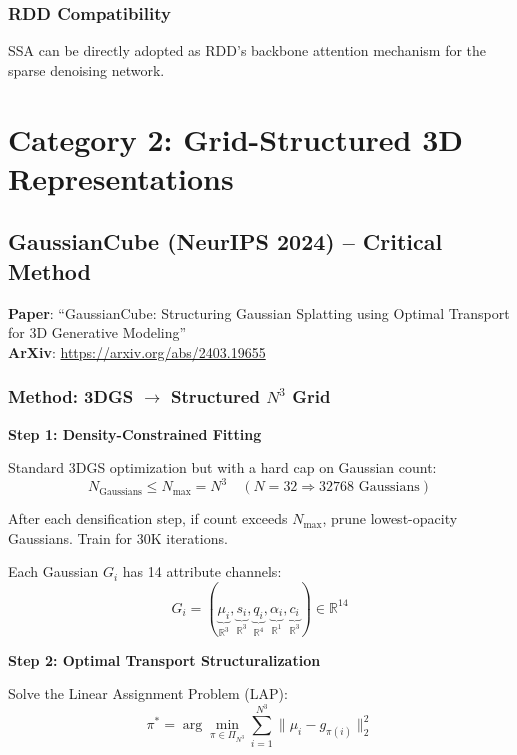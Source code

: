 \documentclass[11pt, a4paper]{article}
\begin{document}
\subsubsection{RDD Compatibility}

SSA can be directly adopted as RDD's backbone attention mechanism for the sparse denoising network.

\section{Category 2: Grid-Structured 3D Representations}

\subsection{GaussianCube (NeurIPS 2024) -- Critical Method}

\textbf{Paper}: ``GaussianCube: Structuring Gaussian Splatting using Optimal Transport for 3D Generative Modeling''\\
\textbf{ArXiv}: \url{https://arxiv.org/abs/2403.19655}

\subsubsection{Method: 3DGS $\to$ Structured $N^3$ Grid}

\textbf{Step 1: Density-Constrained Fitting}

Standard 3DGS optimization but with a hard cap on Gaussian count:
\begin{equation}
    N_{\text{Gaussians}} \leq N_{\max} = N^3 \quad (N=32 \Rightarrow 32768 \text{ Gaussians})
\end{equation}

After each densification step, if count exceeds $N_{\max}$, prune lowest-opacity Gaussians. Train for 30K iterations.

Each Gaussian $G_i$ has 14 attribute channels:
\begin{equation}
    G_i = (\underbrace{\mu_i}_{\mathbb{R}^3}, \underbrace{s_i}_{\mathbb{R}^3}, \underbrace{q_i}_{\mathbb{R}^4}, \underbrace{\alpha_i}_{\mathbb{R}^1}, \underbrace{c_i}_{\mathbb{R}^3}) \in \mathbb{R}^{14}
\end{equation}

\textbf{Step 2: Optimal Transport Structuralization}

Solve the Linear Assignment Problem (LAP):
\begin{equation}
    \pi^* = \arg\min_{\pi \in \Pi_{N^3}} \sum_{i=1}^{N^3} \|\mu_i - g_{\pi(i)}\|_2^2
\end{equation}
\end{document}
